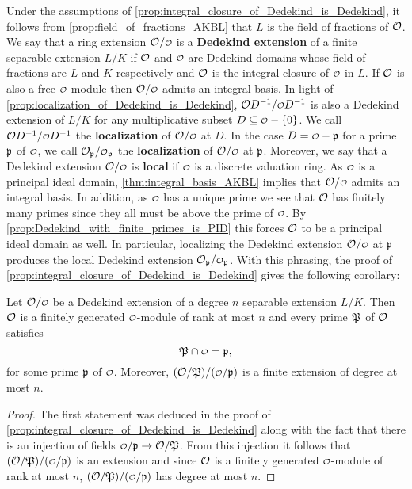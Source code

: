     Under the assumptions of \cref{prop:integral_closure_of_Dedekind_is_Dedekind}, it follows from \cref{prop:field_of_fractions_AKBL} that $L$ is the field of fractions of $\mathcal{O}$. We say that a ring extension $\mc{O}/\smc{O}$ is a \textbf{Dedekind extension} of a finite separable extension $L/K$ if $\mathcal{O}$ and $\smc{O}$ are Dedekind domains whose field of fractions are $L$ and $K$ respectively and $\mathcal{O}$ is the integral closure of $\smc{O}$ in $L$. If $\mathcal{O}$ is also a free $\smc{O}$-module then $\mc{O}/\smc{O}$ admits an integral basis. In light of \cref{prop:localization_of_Dedekind_is_Dedekind}, $\mc{O}D^{-1}/\smc{O}D^{-1}$ is also a Dedekind extension of $L/K$ for any multiplicative subset $D \subseteq \smc{O}-\{0\}$. We call $\mc{O}D^{-1}/\smc{O}D^{-1}$ the \textbf{localization} of $\mc{O}/\smc{O}$ at $D$. In the case $D = \smc{O}-\mf{p}$ for a prime $\mathfrak{p}$ of $\smc{O}$, we call $\mc{O}_{\mf{p}}/\smc{O}_{\mf{p}}$ the \textbf{localization} of $\mc{O}/\smc{O}$ at $\mathfrak{p}$. Moreover, we say that a Dedekind extension $\mc{O}/\smc{O}$ is \textbf{local} if $\smc{O}$ is a discrete valuation ring. As $\smc{O}$ is a principal ideal domain, \cref{thm:integral_basis_AKBL} implies that $\mc{O}/\smc{O}$ admits an integral basis. In addition, as $\smc{O}$ has a unique prime we see that $\mathcal{O}$ has finitely many primes since they all must be above the prime of $\smc{O}$. By \cref{prop:Dedekind_with_finite_primes_is_PID} this forces $\mathcal{O}$ to be a principal ideal domain as well. In particular, localizing the Dedekind extension $\mc{O}/\smc{O}$ at $\mathfrak{p}$ produces the local Dedekind extension $\mc{O}_{\mf{p}}/\smc{O}_{\mf{p}}$. With this phrasing, the proof of \cref{prop:integral_closure_of_Dedekind_is_Dedekind} gives the following corollary:

    \begin{corollary}\label{cor:integral_closure_of_Dedekind_is_Dedekind}
      Let $\mc{O}/\smc{O}$ be a Dedekind extension of a degree $n$ separable extension $L/K$. Then $\mathcal{O}$ is a finitely generated $\smc{O}$-module of rank at most $n$ and every prime $\mathfrak{P}$ of $\mathcal{O}$ satisfies
      \[
        \mf{P} \cap \smc{O} = \mf{p},
      \]
      for some prime $\mathfrak{p}$ of $\smc{O}$. Moreover, $(\mc{O}/\mf{P})/(\smc{O}/\mf{p})$ is a finite extension of degree at most $n$.
    \end{corollary}
    \begin{proof}
      The first statement was deduced in the proof of \cref{prop:integral_closure_of_Dedekind_is_Dedekind} along with the fact that there is an injection of fields $\smc{O}/\mf{p} \to \mc{O}/\mf{P}$. From this injection it follows that $(\mc{O}/\mf{P})/(\smc{O}/\mf{p})$ is an extension and since $\mathcal{O}$ is a finitely generated $\smc{O}$-module of rank at most $n$, $(\mc{O}/\mf{P})/(\smc{O}/\mf{p})$ has degree at most $n$.
    \end{proof}


